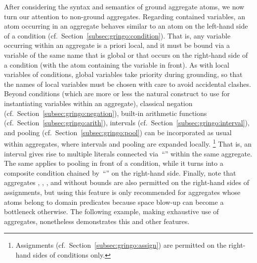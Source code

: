 After considering the syntax and semantics of ground aggregate atoms,
we now turn our attention to non-ground aggregates.
Regarding contained variables, an atom occurring in an aggregate behaves
similar to an atom on the left-hand side of a condition
(cf.\ Section~\ref{subsec:gringo:condition}).
That is, any variable occurring within an aggregate is a priori local,
and it must be bound via a variable of the same name that is global
or that occurs on the right-hand side of a condition
(with the atom containing the variable in front).
As with local variables of conditions, global variables take priority
during grounding, so that the names of local variables must be chosen
with care to avoid accidental clashes.
Beyond conditions (which are more or less the natural construct to use
for instantiating variables within an aggregate),
classical negation (cf.\ Section~\ref{subsec:gringo:negation}),
built-in arithmetic functions (cf.\ Section~\ref{subsec:gringo:arith}),
intervals (cf.\ Section~\ref{subsec:gringo:interval}), and 
pooling (cf.\ Section~\ref{subsec:gringo:pool})
can be incorporated as usual within aggregates,
where intervals and pooling are expanded locally.%
\footnote{%
  Assignments (cf.\ Section~\ref{subsec:gringo:assign}) 
  are permitted on the right-hand sides of conditions only.}
That is, an interval gives rise to multiple literals connected via~``\code{,}''
within the same aggregate.
The same applies to pooling in front of a condition,
while it turns into a composite condition chained by~``\code{:}'' on the right-hand side.
Finally, note that aggregates 
, , , and 
without bounds are also permitted on the
right-hand sides of assignments, but using this feature is only recommended
for aggregates whose atoms belong to domain predicates because space blow-up
can become a bottleneck otherwise.
The following example, making exhaustive use of aggregates,
nonetheless demonstrates this and other features.

